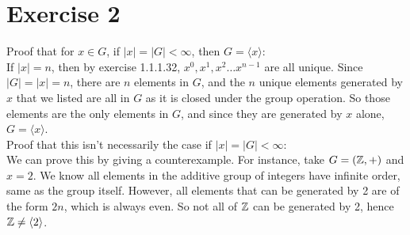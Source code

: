 \documentclass[12pt]{article}
\begin{document}
    
    \section*{Exercise 2}
    Proof that for $x \in G$, if $|x| = |G| < \infty$,
    then $G = \langle x \rangle:$ \\
    If $|x| = n$,
    then by exercise 1.1.1.32,
    $x^0, x^1, x^2 \dots x^{n-1}$ are all unique.
    Since $|G| = |x| = n$,
    there are $n$ elements in $G$,
    and the $n$ unique elements generated by $x$ that we listed
    are all in $G$ as it is closed under the group operation.
    So those elements are the only elements in $G$,
    and since they are generated by $x$ alone, 
    $G = \langle x \rangle$. \\
    Proof that this isn't necessarily the case if $|x| = |G| < \infty$: \\
    We can prove this by giving a counterexample.
    For instance, take $G = (\mathbb{Z}, +)$ and $x = 2$.
    We know all elements in the additive group of integers have
    infinite order,
    same as the group itself.
    However, all elements that can be generated by 2 are of the form $2n$,
    which is always even.
    So not all of $\mathbb{Z}$ can be generated by 2,
    hence $\mathbb{Z} \neq \langle 2 \rangle$.
\end{document}
